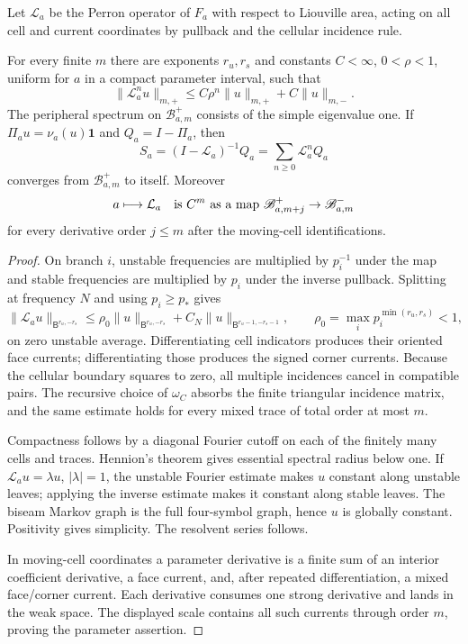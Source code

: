 Let $\mathcal L_a$ be the Perron operator of $F_a$ with respect to Liouville
area, acting on all cell and current coordinates by pullback and the cellular
incidence rule.

\begin{theorem}
\label{thm:r7-a1-anisotropic}
For every finite $m$ there are exponents $r_u,r_s$ and constants
$C<\infty$, $0<\rho<1$, uniform for $a$ in a compact parameter interval, such
that
\[
 \|\mathcal L_a^n u\|_{m,+}
 \le C\rho^n\|u\|_{m,+}+C\|u\|_{m,-}.
\]
The peripheral spectrum on $\mathscr B_{a,m}^+$ consists of the simple
eigenvalue one.  If $\Pi_a u=\nu_a(u)\mathbf1$ and $Q_a=I-\Pi_a$, then
\[
 S_a=(I-\mathcal L_a)^{-1}Q_a
 =\sum_{n\ge0}\mathcal L_a^nQ_a
\]
converges from $\mathscr B_{a,m}^+$ to itself.  Moreover
\[
 a\longmapsto\mathcal L_a
 \quad\hbox{is }C^m\hbox{ as a map }
 \mathscr B_{a,m+j}^+\to\mathscr B_{a,m}^-
\]
for every derivative order $j\le m$ after the moving-cell identifications.
\end{theorem}

\begin{proof}
On branch $i$, unstable frequencies are multiplied by $p_i^{-1}$ under the
map and stable frequencies are multiplied by $p_i$ under the inverse
pullback.  Splitting at frequency $N$ and using $p_i\ge p_*$ gives
\[
 \|\mathcal L_a u\|_{\mathsf B^{r_u,-r_s}}
 \le \rho_0\|u\|_{\mathsf B^{r_u,-r_s}}
 +C_N\|u\|_{\mathsf B^{r_u-1,-r_s-1}},
 \qquad
 \rho_0=\max_i p_i^{\min(r_u,r_s)}<1,
\]
on zero unstable average.  Differentiating cell indicators produces their
oriented face currents; differentiating those produces the signed corner
currents.  Because the cellular boundary squares to zero, all multiple
incidences cancel in compatible pairs.  The recursive choice of $\omega_C$
absorbs the finite triangular incidence matrix, and the same estimate holds
for every mixed trace of total order at most $m$.

Compactness follows by a diagonal Fourier cutoff on each of the finitely many
cells and traces.  Hennion's theorem gives essential spectral radius below
one.  If $\mathcal L_au=\lambda u$, $|\lambda|=1$, the unstable Fourier
estimate makes $u$ constant along unstable leaves; applying the inverse
estimate makes it constant along stable leaves.  The biseam Markov graph is
the full four-symbol graph, hence $u$ is globally constant.  Positivity gives
simplicity.  The resolvent series follows.

In moving-cell coordinates a parameter derivative is a finite sum of an
interior coefficient derivative, a face current, and, after repeated
differentiation, a mixed face/corner current.  Each derivative consumes one
strong derivative and lands in the weak space.  The displayed scale contains
all such currents through order $m$, proving the parameter assertion.
\end{proof}

